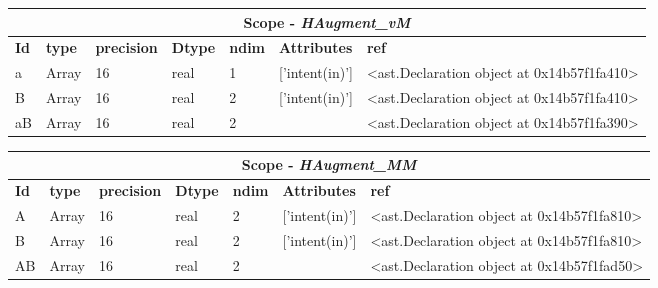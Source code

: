 \documentclass{report}
\begin{document}
\begin{center}
\begin{longtable}{|p{3.5cm}|p{1.5cm}|p{1.5cm}|p{1.5cm}|p{1cm}|p{2cm}|p{4cm}| }
\hline
\multicolumn{7}{|c|}{\textbf{Scope} -  \textbf{\textit{HAugment\_vM}}} \\ 
\hline
\textbf{Id} & \textbf{type} & \textbf{precision} & \textbf{Dtype} & \textbf{ndim} & \textbf{Attributes} & \textbf{ref} \\\hline

a & Array & 16 & real & 1 & ['intent(in)'] & <ast.Declaration object at 0x14b57f1fa410> \\\hline

B & Array & 16 & real & 2 & ['intent(in)'] & <ast.Declaration object at 0x14b57f1fa410> \\\hline

aB & Array & 16 & real & 2 &  & <ast.Declaration object at 0x14b57f1fa390> \\\hline

\end{longtable}
\end{center}

 \vspace{1cm}

\begin{center}
\begin{longtable}{|p{3.5cm}|p{1.5cm}|p{1.5cm}|p{1.5cm}|p{1cm}|p{2cm}|p{4cm}| }
\hline
\multicolumn{7}{|c|}{\textbf{Scope} -  \textbf{\textit{HAugment\_MM}}} \\ 
\hline
\textbf{Id} & \textbf{type} & \textbf{precision} & \textbf{Dtype} & \textbf{ndim} & \textbf{Attributes} & \textbf{ref} \\\hline

A & Array & 16 & real & 2 & ['intent(in)'] & <ast.Declaration object at 0x14b57f1fa810> \\\hline

B & Array & 16 & real & 2 & ['intent(in)'] & <ast.Declaration object at 0x14b57f1fa810> \\\hline

AB & Array & 16 & real & 2 &  & <ast.Declaration object at 0x14b57f1fad50> \\\hline

\end{longtable}
\end{center}

 \vspace{1cm}
\end{document}

